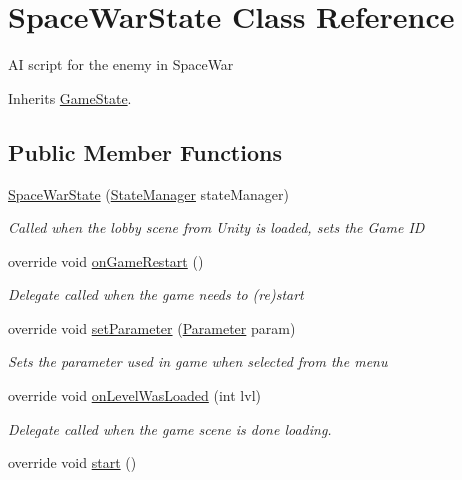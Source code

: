 \hypertarget{class_space_war_state}{\section{Space\-War\-State Class Reference}
\label{class_space_war_state}
}


A\-I script for the enemy in Space\-War  




Inherits \hyperlink{class_game_state}{Game\-State}.

\subsection*{Public Member Functions}
\begin{DoxyCompactItemize}
\item 
\hyperlink{class_space_war_state_ad684be48c3453d8f98c1d4cb4d4ea087}{Space\-War\-State} (\hyperlink{class_state_manager}{State\-Manager} state\-Manager)
\begin{DoxyCompactList}\small\item\em Called when the lobby scene from Unity is loaded, sets the Game I\-D \end{DoxyCompactList}\item 
override void \hyperlink{class_space_war_state_a1a5b24ade519794138827f4a8912f202}{on\-Game\-Restart} ()
\begin{DoxyCompactList}\small\item\em Delegate called when the game needs to (re)start \end{DoxyCompactList}\item 
override void \hyperlink{class_space_war_state_a7852c522f077254d78fa46ef82662ad7}{set\-Parameter} (\hyperlink{class_parameter}{Parameter} param)
\begin{DoxyCompactList}\small\item\em Sets the parameter used in game when selected from the menu \end{DoxyCompactList}\item 
override void \hyperlink{class_space_war_state_ac965e3936108a8fea8055e4e250d66bd}{on\-Level\-Was\-Loaded} (int lvl)
\begin{DoxyCompactList}\small\item\em Delegate called when the game scene is done loading. \end{DoxyCompactList}\item 
override void \hyperlink{class_space_war_state_afbedfd935854568d8d34c540bb6de67b}{start} ()

\end{DoxyCompactItemize}
